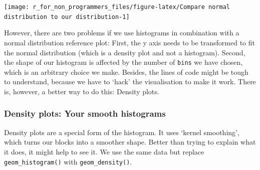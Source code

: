 \documentclass[
]{book}
\newenvironment{Shaded}{\begin{snugshade}}{\end{snugshade}}
\newcommand{\AttributeTok}[1]{\textcolor[rgb]{0.77,0.63,0.00}{#1}}
\newcommand{\CommentTok}[1]{\textcolor[rgb]{0.56,0.35,0.01}{\textit{#1}}}
\newcommand{\DecValTok}[1]{\textcolor[rgb]{0.00,0.00,0.81}{#1}}
\newcommand{\FunctionTok}[1]{\textcolor[rgb]{0.00,0.00,0.00}{#1}}
\newcommand{\NormalTok}[1]{#1}
\newcommand{\SpecialCharTok}[1]{\textcolor[rgb]{0.00,0.00,0.00}{#1}}
\newcommand{\StringTok}[1]{\textcolor[rgb]{0.31,0.60,0.02}{#1}}
\begin{document}
\begin{Shaded}
\end{Shaded}

\begin{center}\texttt{[image: r\_for\_non\_programmers\_files/figure-latex/Compare normal distribution to our distribution-1]} \end{center}

However, there are two problems if we use histograms in combination with a normal distribution reference plot: First, the y axis needs to be transformed to fit the normal distribution (which is a density plot and not a histogram). Second, the shape of our histogram is affected by the number of \texttt{bins} we have chosen, which is an arbitrary choice we make. Besides, the lines of code might be tough to understand, because we have to `hack' the visualisation to make it work. There is, however, a better way to do this: Density plots.

\hypertarget{density-plots-your-smooth-histograms}{%
\subsubsection{Density plots: Your smooth histograms}\label{density-plots-your-smooth-histograms}}

Density plots are a special form of the histogram. It uses `kernel smoothing', which turns our blocks into a smoother shape. Better than trying to explain what it does, it might help to see it. We use the same data but replace \texttt{geom\_histogram()} with \texttt{geom\_density()}.
\end{document}
